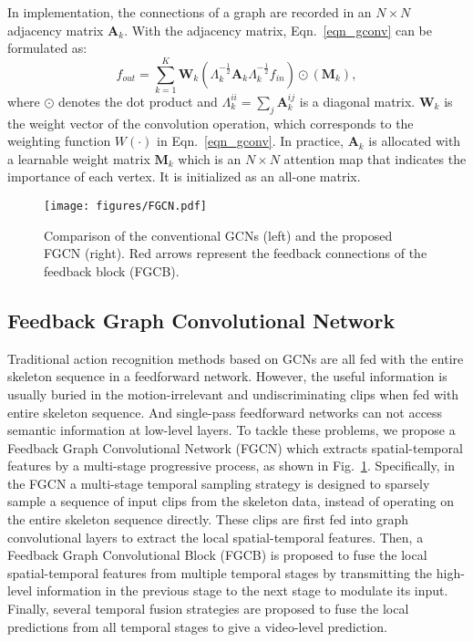 \documentclass[runningheads]{llncs}
\begin{document}
In implementation, the connections of a graph are recorded in an $N \times N$ adjacency matrix $\textbf{A}_k$. With the adjacency matrix, Eqn.~\ref{eqn_gconv} can be formulated as:
\begin{equation}
f_{out}=\sum_{k=1}^K \textbf{W}_k (\Lambda^{-\frac{1}{2}}_k \textbf{A}_k \Lambda^{-\frac{1}{2}}_k f_{in}) \odot (\textbf{M}_k),
\end{equation}
where $\odot$ denotes the dot product and $\Lambda^{ii}_k=\sum_{j} \textbf{A}^{ij}_k$ is a diagonal matrix. $\textbf{W}_k$ is the weight vector of the convolution operation, which corresponds to the weighting function $W(\cdot)$ in Eqn.~\ref{eqn_gconv}. In practice, $ \textbf{A}_k $ is allocated with a learnable weight matrix $\textbf{M}_k$ which is an $N\times N$ attention map that indicates the importance of each vertex. It is initialized as an all-one matrix.

\begin{figure}[t]
	\centering
	\texttt{[image: figures/FGCN.pdf]}
	\caption{Comparison of the conventional GCNs (left) and the proposed FGCN (right). Red arrows represent the feedback connections of the feedback block (FGCB).}
	\vspace{-4mm}
	\label{fig-fgcn}
\end{figure}

\subsection{Feedback Graph Convolutional Network}
Traditional action recognition methods \cite{yan2018spatial,shi2019two,shi2019skeleton,li2019actional} based on GCNs are all fed with the entire skeleton sequence in a feedforward network. However, the useful information is usually buried in the motion-irrelevant and undiscriminating clips when fed with entire skeleton sequence. And single-pass feedforward networks can not access semantic information at low-level layers.
To tackle these problems, we propose a Feedback Graph Convolutional Network (FGCN) which extracts spatial-temporal features by a multi-stage progressive process, as shown in Fig.~\ref{fig-fgcn}. Specifically, in the FGCN a multi-stage temporal sampling strategy is designed to sparsely sample a sequence of input clips from the skeleton data, instead of operating on the entire skeleton sequence directly. These clips are first fed into graph convolutional layers to extract the local spatial-temporal features. Then, a Feedback Graph Convolutional Block (FGCB) is proposed to fuse the local spatial-temporal features from multiple temporal stages by transmitting the high-level information in the previous stage to the next stage to modulate its input. Finally, several temporal fusion strategies are proposed to fuse the local predictions from all temporal stages to give a video-level prediction.
\end{document}
